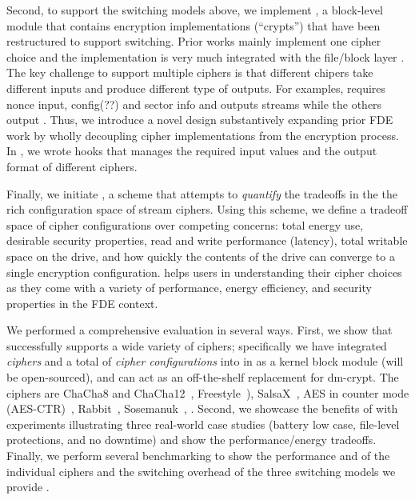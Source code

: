 Second, to support the switching models above, we implement \sysB, a
block-level module that contains encryption implementations (``crypts'') that
have been restructured to support switching. Prior works mainly implement one
cipher choice and the implementation is very much integrated with the file/block
layer \cite{StrongBox, any-other-works-like-this?}. The key challenge to support
multiple ciphers is that different chipers take different inputs and produce
different type of outputs. For examples, \encA requires nonce input, \encB
config(??\xxx) and \encC sector info and \encC outputs streams while the others
output \xxx. Thus, we introduce a novel design substantively expanding prior FDE
work by wholly decoupling cipher implementations from the encryption process. In
\sysB, we wrote hooks that manages the required input values and the output
format of different ciphers.


Finally, we initiate \sysC, a scheme that attempts to {\em quantify} the
tradeoffs in the the rich configuration space of stream ciphers. Using this
scheme, we define a tradeoff space of cipher configurations over competing
concerns: total energy use, desirable security properties, read and write
performance (latency), total writable space on the drive, and how quickly the
contents of the drive can converge to a single encryption configuration. \sysC
helps users in understanding their cipher choices as they come with a variety of
performance, energy efficiency, and security properties in the FDE context.


We performed a comprehensive evaluation in several ways.
%
First, we show that \sys successfully supports a wide variety of ciphers;
specifically we have integrated {\em \numCiphers ciphers} and a total of {\em
\numConfigs cipher configurations} into \sys in \locTotal as a kernel block
module (will be open-sourced), and can act as an off-the-shelf replacement for
dm-crypt. The ciphers are ChaCha8 and ChaCha12~\cite{ChaCha20},
Freestyle~\cite{Freestyle}), SalsaX~\cite{SalsaX}, AES in counter mode
(AES-CTR)~\cite{AESCTR}, Rabbit~\cite{Rabbit}, Sosemanuk~\cite{Sosemanuk}, \xxx.
%
Second, we showcase the benefits of \sys with experiments illustrating three
real-world case studies (battery low case, file-level protections, and no
downtime) and show the performance/energy tradeoffs.
%
Finally, we perform several benchmarking to show the performance and \xxx of the
individual ciphers and the switching overhead of the three switching models we
provide .


